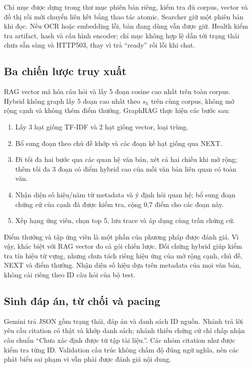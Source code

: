 Chỉ mục được dựng trong thư mục phiên bản riêng, kiểm tra đủ corpus, vector và đồ thị rồi mới chuyển liên kết  bằng thao tác atomic. Searcher giữ một phiên bản khi đọc. Nếu OCR hoặc embedding lỗi, bản đang dùng vẫn được giữ. Health kiểm tra artifact, hash và cấu hình encoder; chỉ mục không hợp lệ dẫn tới trạng thái chưa sẵn sàng và HTTP503, thay vì trả ``ready'' rồi lỗi khi chat.

\subsection{Ba chiến lược truy xuất}
RAG vector mã hóa câu hỏi và lấy 5 đoạn cosine cao nhất trên toàn corpus. Hybrid không graph lấy 5 đoạn cao nhất theo $s_h$ trên cùng corpus, không mở rộng cạnh và không thêm điểm thưởng. GraphRAG thực hiện các bước sau:
\begin{enumerate}
\item Lấy 3 hạt giống TF-IDF và 2 hạt giống vector, loại trùng.
\item Bổ sung đoạn theo chủ đề khớp và các đoạn kề hạt giống qua NEXT.
\item Đi tối đa hai bước qua các quan hệ văn bản, xét cả hai chiều khi mở rộng; thêm tối đa 3 đoạn có điểm hybrid cao của mỗi văn bản liên quan có toàn văn.
\item Nhận diện số hiệu/năm từ metadata và ý định hỏi quan hệ; bổ sung đoạn chứng cứ của cạnh đã được kiểm tra, cộng 0,7 điểm cho các đoạn này.
\item Xếp hạng ứng viên, chọn top 5, lưu trace và áp dụng cùng trần chứng cứ.
\end{enumerate}
Điểm thưởng và tập ứng viên là một phần của phương pháp được đánh giá. Vì vậy, khác biệt với RAG vector đo cả gói chiến lược. Đối chứng hybrid giúp kiểm tra tín hiệu từ vựng, nhưng chưa tách riêng hiệu ứng của mở rộng cạnh, chủ đề, NEXT và điểm thưởng. Nhận diện số hiệu dựa trên metadata của mọi văn bản, không cài riêng theo ID câu hỏi của bộ test.

\subsection{Sinh đáp án, từ chối và pacing}
Gemini trả JSON gồm trạng thái, đáp án và danh sách ID nguồn. Nhánh trả lời yêu cầu citation có thật và khớp danh sách; nhánh thiếu chứng cứ chỉ chấp nhận câu chuẩn ``Chưa xác định được từ tập tài liệu.''. Các nhóm citation như \code{[ID1, ID2]} được kiểm tra từng ID. Validation cấu trúc không chấm độ đúng ngữ nghĩa, nên các phát biểu sai phạm vi vẫn phải được đánh giá nội dung.

